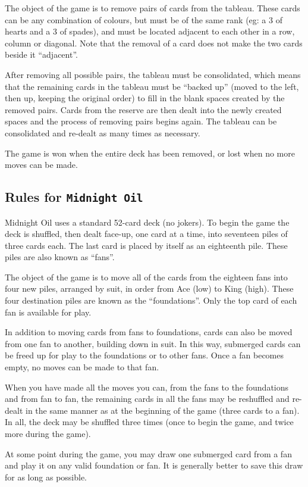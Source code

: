 The object of the game is to remove pairs of cards
from the tableau.  These cards can be any combination
of colours, but must be of the same rank (eg: a 3 of
hearts and a 3 of spades), and must be located
adjacent to each other in a row, column or diagonal.
Note that the removal of a card does not make the two
cards beside it ``adjacent''.

After removing all possible pairs, the tableau must be
consolidated, which means that the remaining cards in
the tableau must be ``backed up'' (moved to the left,
then up, keeping the original order) to fill in the
blank spaces created by the removed pairs.  Cards from
the reserve are then dealt into the newly created
spaces and the process of removing pairs begins again.
The tableau can be consolidated and re-dealt as many
times as necessary.

The game is won when the entire deck has been removed,
or lost when no more moves can be made.

\subsection{Rules for {\tt Midnight Oil}}
Midnight Oil uses a standard 52-card deck (no jokers).
To begin the game the deck is shuffled, then dealt
face-up, one card at a time, into seventeen piles of
three cards each.  The last card is placed by itself
as an eighteenth pile.  These piles are also known as
``fans''.

The object of the game is to move all of the cards
from the eighteen fans into four new piles, arranged
by suit, in order from Ace (low) to King (high).
These four destination piles are known as the
``foundations''.  Only the top card of each fan is
available for play.

In addition to moving cards from fans to foundations,
cards can also be moved from one fan to another,
building down in suit.  In this way, submerged cards
can be freed up for play to the foundations or to
other fans.  Once a fan becomes empty, no
moves can be made to that fan.

When you have made all the moves you can, from the
fans to the foundations and from fan to fan, the
remaining cards in all the fans may be reshuffled and
re-dealt in the same manner as at the beginning of the
game (three cards to a fan).  In all, the deck may be
shuffled three times (once to begin the game, and
twice more during the game).

At some point during the game, you may draw one
submerged card from a fan and play it on any valid
foundation or fan.  It is generally better to save
this draw for as long as possible.

